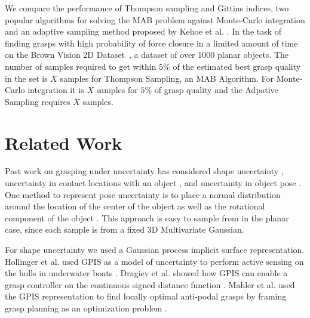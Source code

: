 \documentclass[journal,transmag]{IEEEtran}%
\begin{document}
We compare the performance of Thompson sampling and Gittins indices, two popular algorithms for solving the MAB problem against Monte-Carlo integration and an adaptive sampling method proposed by Kehoe et al. \cite{kehoe2012toward}. In the task of finding grasps with high probability of force closure in a limited amount of time on the Brown Vision 2D Dataset~\cite{brown, christopoulos2007handling}, a dataset of over 1000 planar objects.
The number of samples required to get within $5\%$ of the estimated best grasp quality in the set is $X$ samples for Thompson Sampling, an MAB Algorithm. For Monte-Carlo integration it is $X$ samples for $5\%$ of grasp quality and the Adpative Sampling requires  $X$ samples. 


\section{Related Work}

Past work on grasping under uncertainty has considered shape uncertainty \cite{goldberg1990bayesian, stulp2011learning}, uncertainty in contact locations with an object \cite{zheng2005}, and uncertainty in object pose \cite{christopoulos2007handling, weisz2012pose, kim2012physically}. One method to represent pose uncertainty is to place a normal distribution around the location of the center of the object as well as the rotational component of the object \cite{barfoot2014Pose}. This approach is easy to sample from in the planar case, since each sample is from a fixed 3D Multivariate Gaussian. 

For shape uncertainty we used a Gaussian process implicit surface representation. 
Hollinger et al. used GPIS as a model of uncertainty to perform active sensing on the hulls in underwater boats \cite{hollinger2013}.
Dragiev et al. showed how GPIS can enable a grasp controller on the continuous signed distance function \cite{dragiev2011}.
Mahler et al. used the GPIS representation to find locally optimal anti-podal grasps by framing grasp planning as an optimization problem \cite{mahler2015gp}. 
\end{document}
